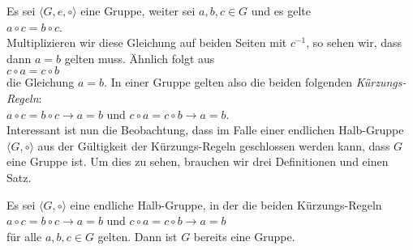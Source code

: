 \remark Es sei $\langle G, e, \circ \rangle$ eine Gruppe, weiter sei $a,b,c \in G$ und es gelte
\\[0.2cm]
\hspace*{1.3cm} $a \circ c = b \circ c$.
\\[0.2cm]
Multiplizieren wir diese Gleichung auf beiden Seiten mit $c^{-1}$, so sehen wir, dass dann $a = b$ gelten
muss.  \"{A}hnlich folgt aus
\\[0.2cm]
\hspace*{1.3cm} $c \circ a = c \circ b$
\\[0.2cm]
die Gleichung $a = b$.  In einer Gruppe gelten also die beiden folgenden \emph{\color{blue}K\"{u}rzungs-Regeln}:
\\[0.2cm]
\hspace*{1.3cm} 
$a \circ c = b \circ c \rightarrow a = b$ \quad und \quad
$c \circ a = c \circ b \rightarrow a = b$.
\\[0.2cm]
Interessant ist nun die Beobachtung, dass im Falle einer endlichen Halb-Gruppe 
$\langle G, \circ \rangle$ aus der G\"{u}ltigkeit der  
K\"{u}rzungs-Regeln geschlossen werden kann, dass $G$ eine Gruppe ist.
Um dies zu sehen, brauchen wir drei Definitionen und einen Satz.
\eoxs


\begin{Satz} \label{satz:kuerzungsregel_gruppe}
  Es sei $\langle G, \circ \rangle$ eine {\color{red}endliche} Halb-Gruppe, in der die beiden K\"{u}rzungs-Regeln
  \\[0.2cm]
  \hspace*{1.3cm}
  $a \circ c = b \circ c \rightarrow a = b$ \quad und \quad
  $c \circ a = c \circ b \rightarrow a = b$
  \\[0.2cm]
  f\"{u}r alle $a,b,c \in G$ gelten.  Dann ist $G$ bereits eine Gruppe.
\end{Satz}

